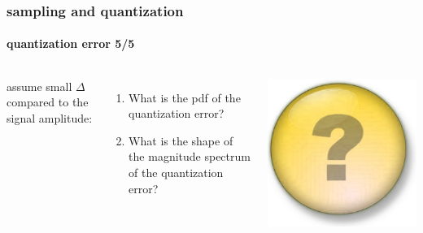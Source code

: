 	\begin{frame}\frametitle{sampling and quantization}\framesubtitle{quantization error 5/5}
		\vspace{-10mm}
		\begin{columns}
                assume small $\Delta$ compared to the signal amplitude:
                \begin{enumerate}
                    \item  What is the pdf of the quantization error?
                    \item  What is the shape of the magnitude spectrum of the quantization error?
                \end{enumerate}
			
			
			
			\begin{flushright}
				 \includegraphics[scale=.08]{Graph/question-mark}
			\end{flushright}
		\end{columns}
		

\end{frame}
